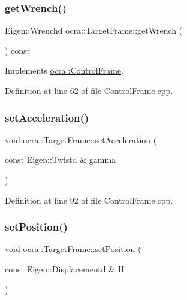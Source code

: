 \subsubsection{\texorpdfstring{get\+Wrench()}{getWrench()}}
{\footnotesize\ttfamily Eigen\+::\+Wrenchd ocra\+::\+Target\+Frame\+::get\+Wrench (\begin{DoxyParamCaption}{ }\end{DoxyParamCaption}) const\hspace{0.3cm}{\ttfamily [virtual]}}



Implements \hyperlink{classocra_1_1ControlFrame_a069aaf1eab98598fbffee263fcde0c56}{ocra\+::\+Control\+Frame}.



Definition at line 62 of file Control\+Frame.\+cpp.

\hypertarget{classocra_1_1TargetFrame_a3cbbcab6f3179320bd6c6f8c5aeabc75}{}\label{classocra_1_1TargetFrame_a3cbbcab6f3179320bd6c6f8c5aeabc75} 
\subsubsection{\texorpdfstring{set\+Acceleration()}{setAcceleration()}}
{\footnotesize\ttfamily void ocra\+::\+Target\+Frame\+::set\+Acceleration (\begin{DoxyParamCaption}\item[{const Eigen\+::\+Twistd \&}]{gamma }\end{DoxyParamCaption})}



Definition at line 92 of file Control\+Frame.\+cpp.

\hypertarget{classocra_1_1TargetFrame_a760081f3ae88a43ff91dc6a746083286}{}\label{classocra_1_1TargetFrame_a760081f3ae88a43ff91dc6a746083286} 
\subsubsection{\texorpdfstring{set\+Position()}{setPosition()}}
{\footnotesize\ttfamily void ocra\+::\+Target\+Frame\+::set\+Position (\begin{DoxyParamCaption}\item[{const Eigen\+::\+Displacementd \&}]{H }\end{DoxyParamCaption})}



